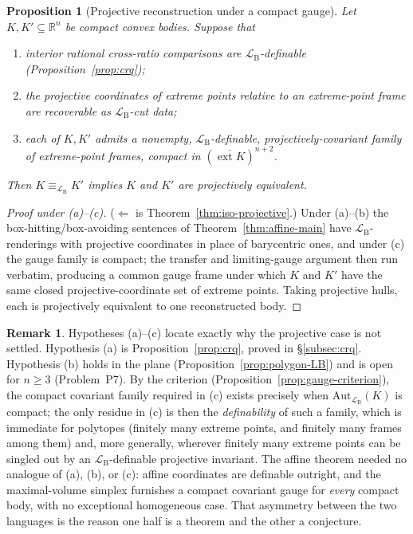 \documentclass[11pt]{amsart}
\newtheorem{proposition}[theorem]{Proposition}
\theoremstyle{definition}
\newtheorem{remark}[theorem]{Remark}
\newcommand{\R}{\mathbb{R}}
\newcommand{\LB}{\mathcal{L}_{\mathrm{B}}}
\newcommand{\ext}{\operatorname{ext}}
\begin{document}
\begin{proposition}[Projective reconstruction under a compact gauge]
\label{prop:projective-reduction}
Let $K,K'\subseteq\R^n$ be compact convex bodies. Suppose that
\begin{enumerate}[label=\textup{(\alph*)}]
\item interior rational cross-ratio comparisons are $\LB$-definable
\textup(Proposition~\ref{prop:crq}\textup);
\item the projective coordinates of extreme points relative to an
extreme-point frame are recoverable as $\LB$-cut data;
\item each of $K,K'$ admits a nonempty, $\LB$-definable,
projectively-covariant family of extreme-point frames, compact in
$(\overline{\ext K})^{n+2}$.
\end{enumerate}
Then $K\equiv_{\LB}K'$ implies $K$ and $K'$ are projectively equivalent.
\end{proposition}

\begin{proof}[Proof under \textup{(a)--(c)}]
($\Leftarrow$ is Theorem~\ref{thm:iso-projective}.) Under (a)--(b) the
box-hitting/box-avoiding sentences of Theorem~\ref{thm:affine-main} have
$\LB$-renderings with projective coordinates in place of barycentric ones, and
under (c) the gauge family is compact; the transfer and limiting-gauge
argument then run verbatim, producing a common gauge frame under which $K$ and
$K'$ have the same closed projective-coordinate set of extreme points. Taking
projective hulls, each is projectively equivalent to one reconstructed body.
\end{proof}

\begin{remark}
Hypotheses (a)--(c) locate exactly why the projective case is not settled.
Hypothesis (a) is Proposition~\ref{prop:crq}, proved in \S\ref{subsec:crq}.
Hypothesis (b) holds in the plane (Proposition~\ref{prop:polygon-LB}) and is
open for $n\ge3$ (Problem~P7). By the criterion
(Proposition~\ref{prop:gauge-criterion}), the compact covariant family required
in (c) exists precisely when $\mathrm{Aut}_{\LB}(K)$ is compact; the only
residue in (c) is then the \emph{definability} of such a family, which is
immediate for polytopes (finitely many extreme points, and finitely many
frames among them) and, more generally, wherever finitely many extreme points
can be singled out by an $\LB$-definable projective invariant. The affine
theorem needed no analogue of (a), (b), or (c): affine coordinates are
definable outright, and the maximal-volume simplex furnishes a compact
covariant gauge for \emph{every} compact body, with no exceptional homogeneous
case. That asymmetry between the two languages is the reason one half is a
theorem and the other a conjecture.
\end{remark}
\end{document}
